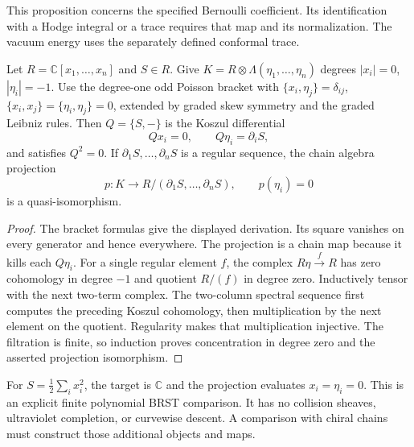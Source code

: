 This proposition concerns the specified Bernoulli coefficient.
Its identification with a Hodge integral or a trace requires that map and its normalization.
The vacuum energy uses the separately defined conformal trace.

\begin{theorem}
\label{thm:cbc26-finite-bv}
Let $R=\mathbb C[x_1,\ldots,x_n]$ and $S\in R$.
Give $K=R\otimes\Lambda(\eta_1,\ldots,\eta_n)$ degrees $|x_i|=0$, $|\eta_i|=-1$.
Use the degree-one odd Poisson bracket with $\{x_i,\eta_j\}=\delta_{ij}$, $\{x_i,x_j\}=\{\eta_i,\eta_j\}=0$, extended by graded skew symmetry and the graded Leibniz rules.
Then $Q=\{S,-\}$ is the Koszul differential
\[
 Qx_i=0,\qquad Q\eta_i=\partial_i S,
\]
and satisfies $Q^2=0$.
If $\partial_1S,\ldots,\partial_nS$ is a regular sequence, the chain algebra projection
\[
 p:K\longrightarrow R/(\partial_1S,\ldots,\partial_nS),
 \qquad p(\eta_i)=0
\]
is a quasi-isomorphism.
\end{theorem}
\begin{proof}
The bracket formulas give the displayed derivation.
Its square vanishes on every generator and hence everywhere.
The projection is a chain map because it kills each $Q\eta_i$.
For a single regular element $f$, the complex $R\eta\xrightarrow{f}R$ has zero cohomology in degree $-1$ and quotient $R/(f)$ in degree zero.
Inductively tensor with the next two-term complex.
The two-column spectral sequence first computes the preceding Koszul cohomology, then multiplication by the next element on the quotient.
Regularity makes that multiplication injective.
The filtration is finite, so induction proves concentration in degree zero and the asserted projection isomorphism.
\end{proof}

For $S=\tfrac12\sum_i x_i^2$, the target is $\mathbb C$ and the projection evaluates $x_i=\eta_i=0$.
This is an explicit finite polynomial BRST comparison.
It has no collision sheaves, ultraviolet completion, or curvewise descent.
A comparison with chiral chains must construct those additional objects and maps.

